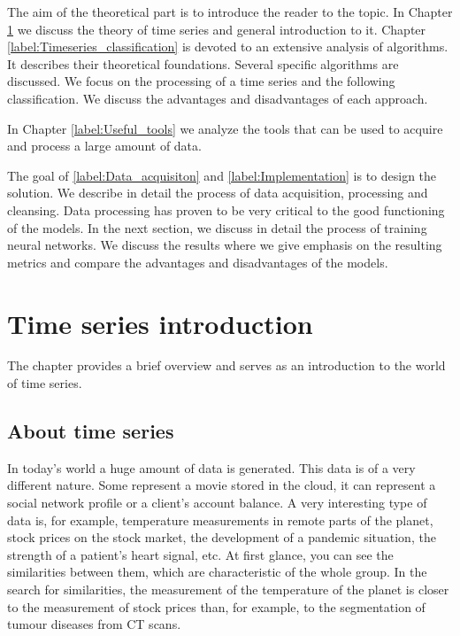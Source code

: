 \documentclass[thesis=M,english]{FITthesis}[2019/12/23]
\begin{document}
The aim of the theoretical part is to introduce the reader to the topic. In Chapter \ref{label:Time_series_introduction} we discuss the theory of time series and general introduction to it. Chapter \ref{label:Timeseries_classification} is devoted to an extensive analysis of algorithms.
It describes their theoretical foundations. Several specific algorithms are discussed. We focus on the processing of a time series and the following classification. We discuss the advantages and disadvantages of each approach.

In Chapter \ref{label:Useful_tools} we analyze the tools that can be used to acquire and process a large amount of data.

The goal of \ref{label:Data_acquisiton} and \ref{label:Implementation} is to design the solution. We describe in detail the process of data acquisition, processing and cleansing. Data processing has proven to be very critical to the good functioning of the models. In the next section, we discuss in detail the process of training neural networks. We discuss the results where we give emphasis on the resulting metrics and compare the advantages and disadvantages of the models.

\chapter{Time series introduction}
\label{label:Time_series_introduction}
The chapter provides a brief overview and serves as an introduction to the world of time series.

\section{About time series}
In today's world a huge amount of data is generated. This data is of a very different nature. Some represent a movie stored in the cloud, it can represent a social network profile or a client's account balance.
A very interesting type of data is, for example, temperature measurements in remote parts of the planet, stock prices on the stock market, the development of a pandemic situation, the strength of a patient's heart signal, etc. At first glance, you can see the similarities between them, which are characteristic of the whole group. In the search for similarities, the measurement of the temperature of the planet is closer to the measurement of stock prices than, for example, to the segmentation of tumour diseases from CT scans.
\end{document}

